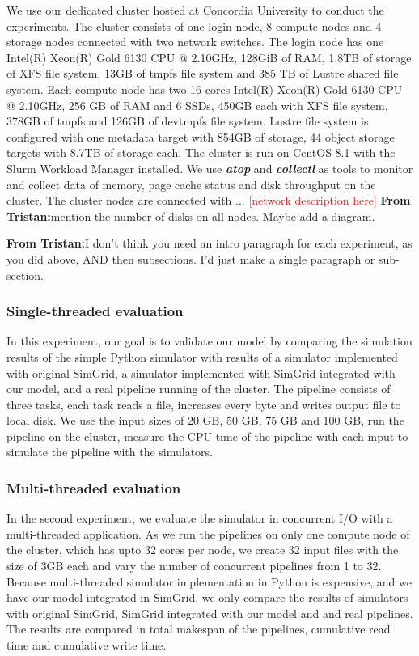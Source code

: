 \documentclass[conference]{IEEEtran}
\newcommand{\tristan}[1]{\color{orange}\textbf{From Tristan:}#1\color{black}}
\begin{document}
			We use our dedicated cluster hosted at Concordia University to conduct the experiments. The cluster 
			consists of one login node, 8 compute nodes 
			and 4 storage nodes connected with two network switches. The login node 
			has one Intel(R) Xeon(R) Gold 6130 CPU @ 2.10GHz, 128GiB of RAM, 1.8TB 
			of storage of XFS file system, 13GB of tmpfs file system and 385 TB of 
			Lustre shared file system. Each compute node has two 16 cores Intel(R) 
			Xeon(R) Gold 6130 CPU @ 2.10GHz, 256 GB of RAM and 6 SSDs, 450GB each 
			with XFS file system, 378GB of tmpfs and 126GB of devtmpfs file system.
			Lustre file system is configured with one metadata target with 854GB 
			of storage, 44 object storage targets with 8.7TB of storage each. 
			The cluster is run on CentOS 8.1 with the Slurm Workload Manager installed. We use 
			\textbf{\textit{atop}} and \textbf{\textit{collectl}} as tools to monitor 
			and collect data of memory, page cache status and disk throughput on 
			the cluster. The cluster nodes are connected with ... 
			\textcolor{red}{[network description here]}
			\tristan{mention the number of disks on all nodes. Maybe add a diagram.}
	

			\tristan{I don't think you need an intro paragraph for each experiment, as you did above, AND then subsections. I'd just make a single paragraph or sub-section.}
			\subsubsection{Single-threaded evaluation}

				In this experiment, our goal is to validate our model by comparing 
				the simulation results of the simple Python simulator with results of 
				a simulator implemented with original SimGrid, a simulator 
				implemented with SimGrid integrated with our model, and a real pipeline 
				running of the cluster. 
				The pipeline consists of three tasks, each task reads a file, 
				increases every byte and writes output file to local disk. 
				We use the input sizes of 20 GB, 50 GB, 75 GB and 100 GB, run 
				the pipeline on the cluster, measure the CPU time of the pipeline 
				with each input to simulate the pipeline with the simulators.

			\subsubsection{Multi-threaded evaluation}

				In the second experiment, we evaluate the simulator in concurrent I/O 
				with a multi-threaded application. As we run the pipelines on 
				only one compute node of the cluster, which has upto 32 cores per node,  
				we create 32 input files with the size of 3GB each and vary the number of 
				concurrent pipelines from 1 to 32. 
				Because multi-threaded simulator implementation in Python is 
				expensive, and we have our model integrated in SimGrid, 
				we only compare the results of simulators with original SimGrid, 
				SimGrid integrated with our model and and real pipelines. 
				The results are compared in total makespan of the pipelines, 
				cumulative read time and cumulative write time.
			
\end{document}
